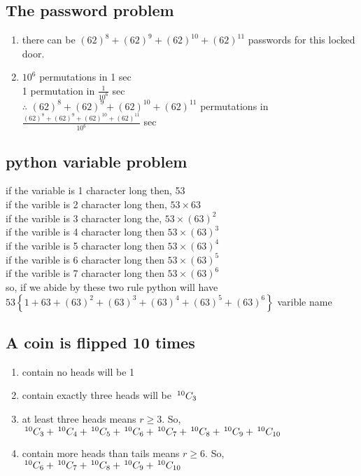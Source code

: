\documentclass{article}
\begin{document}
\subsection{The password problem}
\begin{enumerate}
    \item there can be $(62)^8 + (62)^9 + (62)^{10}+ (62)^{11}$ passwords for this locked door.
    \item $10^6$ permutations in 1 sec\\
        1 permutation in $\frac{1}{10^6}$ sec\\
        $\therefore$ $(62)^8 + (62)^9 + (62)^{10}+ (62)^{11}$ permutations in $\frac{(62)^8 + (62)^9 + (62)^{10}+ (62)^{11}}{10^6}$ sec


\end{enumerate}

\subsection{python variable problem}
\large{
if the variable is 1 character long then, 53\\
if the varible is 2 character long then, $53 \times 63$\\
if the varible is 3 character long the, $53\times(63)^2$\\
if the varible is 4 character long then $53\times(63)^3$\\
if the varible is 5 character long then $53\times(63)^4$\\
if the varible is 6 character long then $53\times(63)^5$\\
if the varible is 7 character long then $53\times(63)^6$\\
so, if we abide by these two rule python will have $53\left\{1+63+(63)^2+(63)^3+(63)^4 + (63)^5 +(63)^6\right\}$ varible name
}

\subsection{A coin is flipped 10 times}
\begin{enumerate}
    \item contain no heads will be 1
    \item contain exactly three heads will be $\,^{10} C _{3}$
    \item at least three heads means $r\ge3$. So,
        $\,^{10} C _{3}+\,^{10} C _{4}+\,^{10} C _{5}+\,^{10} C _{6}+\,^{10} C _{7}+\,^{10} C _{8}+\,^{10} C _{9}+\,^{10} C _{10}$
    \item contain more heads than tails means $r\ge6$. So, $\,^{10} C _{6}+\,^{10} C _{7}+\,^{10} C _{8}+\,^{10} C _{9}+\,^{10} C _{10}$
\end{enumerate}
\end{document}
